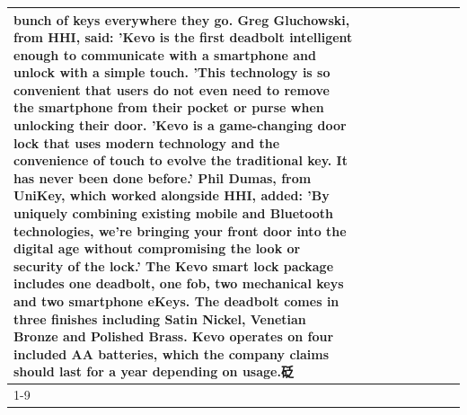 \begin{table}[H]
\begin{tabular}{lllrlllll}
bunch of keys everywhere they go. Greg Gluchowski, from HHI, said: 'Kevo is the first deadbolt intelligent enough to communicate with a smartphone and unlock with a simple touch. 'This technology is so convenient that users do not even need to remove the smartphone from their pocket or purse when unlocking their door. 'Kevo is a game-changing door lock that uses modern technology and the convenience of touch to evolve the traditional key. It has never been done before.' Phil Dumas, from UniKey, which worked alongside HHI, added: 'By uniquely combining existing mobile and Bluetooth technologies, we’re bringing your front door into the digital age without compromising the look or security of the lock.' The Kevo smart lock package includes one deadbolt, one fob, two mechanical keys and two smartphone eKeys. The deadbolt comes in three finishes including Satin Nickel, Venetian Bronze and Polished Brass. Kevo operates on four included AA batteries, which the company claims should last for a year depending on usage.砭 \\
\cline{1-9}

\end{tabular}
\end{table}
